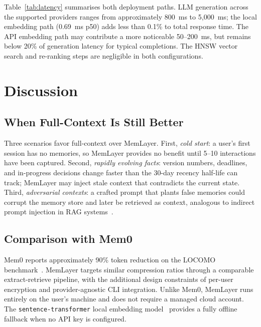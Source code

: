 \documentclass[10pt,twocolumn]{article}
\begin{document}
Table~\ref{tab:latency} summarises both deployment paths. LLM generation
across the supported providers ranges from approximately 800~ms to 5{,}000~ms;
the local embedding path (0.69~ms p50) adds less than 0.1\% to total response
time. The API embedding path may contribute a more noticeable 50--200~ms, but
remains below 20\% of generation latency for typical completions. The HNSW
vector search and re-ranking steps are negligible in both configurations.

\section{Discussion}
\label{sec:discussion}

\subsection{When Full-Context Is Still Better}

\noindent
Three scenarios favor full-context over MemLayer. First, \emph{cold start}:
a user's first session has no memories, so MemLayer provides no benefit until
5--10 interactions have been captured. Second, \emph{rapidly evolving facts}:
version numbers, deadlines, and in-progress decisions change faster than the
30-day recency half-life can track; MemLayer may inject stale context that
contradicts the current state. Third, \emph{adversarial contexts}: a crafted
prompt that plants false memories could corrupt the memory store and later be
retrieved as context, analogous to indirect prompt injection in RAG
systems~\citep{lewis2020retrieval}.

\subsection{Comparison with Mem0}

\noindent
Mem0 reports approximately 90\% token reduction on the LOCOMO
benchmark~\citep{chhikara2025mem0}. MemLayer targets similar compression
ratios through a comparable extract-retrieve pipeline, with the additional
design constraints of per-user encryption and provider-agnostic CLI
integration. Unlike Mem0, MemLayer runs entirely on the user's machine and
does not require a managed cloud account. The
\texttt{sentence-transformer} local embedding model~\citep{reimers2019sentence}
provides a fully offline fallback when no API key is configured.
\end{document}
